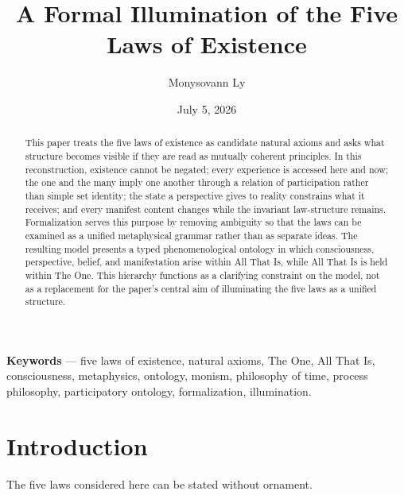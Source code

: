 \documentclass[11pt]{article}
\title{A Formal Illumination of the Five Laws of Existence}
\author{Monysovann Ly}
\date{July 5, 2026}
\begin{document}
\maketitle

\begin{abstract}
This paper treats the five laws of existence as candidate natural axioms and asks what structure becomes visible if they are read as mutually coherent principles.  In this reconstruction, existence cannot be negated; every experience is accessed here and now; the one and the many imply one another through a relation of participation rather than simple set identity; the state a perspective gives to reality constrains what it receives; and every manifest content changes while the invariant law-structure remains.  Formalization serves this purpose by removing ambiguity so that the laws can be examined as a unified metaphysical grammar rather than as separate ideas.  The resulting model presents a typed phenomenological ontology in which consciousness, perspective, belief, and manifestation arise within All That Is, while All That Is is held within The One.  This hierarchy functions as a clarifying constraint on the model, not as a replacement for the paper's central aim of illuminating the five laws as a unified structure.
\end{abstract}

\textbf{Keywords} --- five laws of existence, natural axioms, The One, All That Is, consciousness, metaphysics, ontology, monism, philosophy of time, process philosophy, participatory ontology, formalization, illumination.

\section{Introduction}

The five laws considered here can be stated without ornament.

\begin{center}
\end{center}
\end{document}
